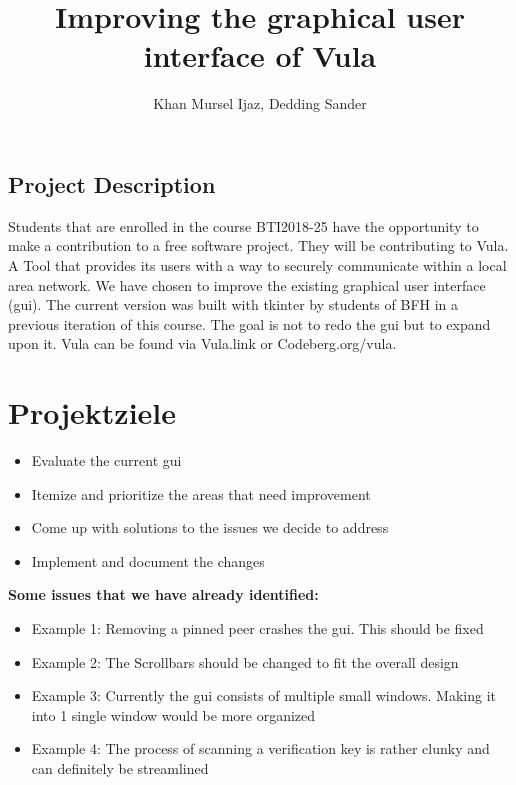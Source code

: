\documentclass[
    type=projectproposal,
    twocolumn
]{bfhpub}
\begin{document}
\title{Improving the graphical user interface of Vula}
\subject{Making secure communication more accessible by improving the user experience.}
\author{Khan Mursel Ijaz, Dedding Sander}


\begin{ProjectDescription}
    \section{Project Description}
    Students that are enrolled in the course BTI2018-25 have the opportunity to make a contribution to a free software project. They will be contributing to Vula. A Tool that provides its users with a way to securely communicate within a local area network. We have chosen to improve the existing graphical user interface (gui). The current version was built with tkinter by students of BFH in a previous iteration of this course. The goal is not to redo the gui but to expand upon it. Vula can be found via Vula.link or Codeberg.org/vula.
\end{ProjectDescription}

\maketitle

\section{Projektziele}
\begin{itemize}
    \item Evaluate the current gui
    \item Itemize and prioritize the areas that need improvement
    \item Come up with solutions to the issues we decide to address
    \item Implement and document the changes
\end{itemize}

\par\nointerlineskip\bfhRule

\textbf{Some issues that we have already identified:}
\begin{itemize}
    \item Example 1: Removing a pinned peer crashes the gui. This should be fixed
    \item Example 2: The Scrollbars should be changed to fit the overall design
    \item Example 3: Currently the gui consists of multiple small windows. Making it into 1 single window would be more organized
    \item Example 4: The process of scanning a verification key is rather clunky and can definitely be streamlined
\end{itemize}
\end{document}
